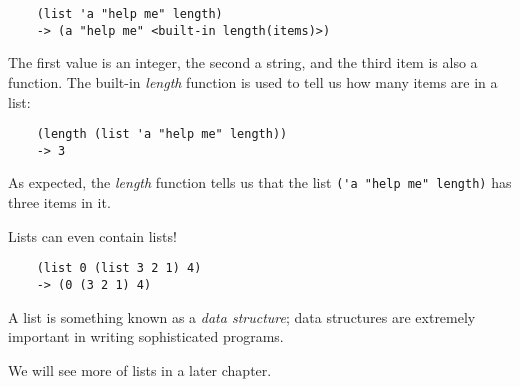 \begin{verbatim}
    (list 'a "help me" length)
    -> (a "help me" <built-in length(items)>)
\end{verbatim}

The first value is an integer, the second a string,
and the third item is also a function. 
The built-in {\it length} function
is used to tell us how many items are in a list:

\begin{verbatim}
    (length (list 'a "help me" length))
    -> 3
\end{verbatim}

As expected, the {\it length} function tells us that the list
\verb!('a "help me" length)! has three items in it.

Lists can even contain lists!

\begin{verbatim}
    (list 0 (list 3 2 1) 4)
    -> (0 (3 2 1) 4)
\end{verbatim}

A list is something known as a {\it data structure};
data structures are extremely important in writing
sophisticated programs.

We will see more of lists in a later chapter.
